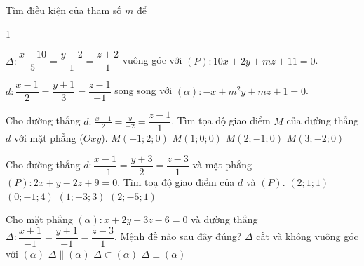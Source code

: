 \begin{vd}
	Tìm điều kiện của tham số $m$ để
	\begin{enumEX}[a)]{1}
		\item $ \Delta:\dfrac{x-10}{5}=\dfrac{y-2}{1}=\dfrac{z+2}{1}$ vuông góc với $(P):10x+2y+mz+11=0$.
		\item $d\colon \dfrac{x-1}{2}=\dfrac{y+1}{3}=\dfrac{z-1}{-1}$ song song với $(\alpha)\colon -x+m^2y+mz+1=0$.
	\end{enumEX}
\end{vd}
\baitaptn
\setcounter{ex}{0}
\begin{ex}
	Cho đường thẳng $d:\,\displaystyle\frac{x-1}{2}=\frac{y}{-2}=\dfrac{z-1}{1}$. Tìm tọa độ giao điểm $ M $ của đường thẳng $ d $ với mặt phẳng ($ Oxy $).
	\choice
	{\True$M(-1;2;0) $}
	{$ M(1;0;0)$}
	{$ M(2;-1;0)$}
	{$ M(3;-2;0)$}
	\loigiai{
	}
\end{ex}


\begin{ex}
	Cho đường thẳng $d: \dfrac{x-1}{-1}=\dfrac{y+3}{2}=\dfrac{z-3}{1}$ và mặt phẳng $(P): 2x+y-2z+9=0$. Tìm toạ độ giao điểm của $d$ và $(P)$.
	\choice
	{$(2; 1; 1)$}
	{\True $(0;-1;4)$}
	{$(1; -3; 3)$}
	{$(2; -5; 1)$} 
	\loigiai{
	}
\end{ex}

\begin{ex}
	Cho mặt phẳng $(\alpha)\colon x+2y+3z-6=0$ và đường thẳng $\Delta\colon\dfrac{x+1}{-1}=\dfrac{y+1}{-1}=\dfrac{z-3}{1}$. Mệnh đề nào sau đây đúng?
	\choice
	{$\Delta$ cắt và không vuông góc với $(\alpha)$}
	{$\Delta\parallel (\alpha)$}
	{\True $\Delta\subset (\alpha)$}
	{$\Delta \perp (\alpha)$}
\end{ex}

